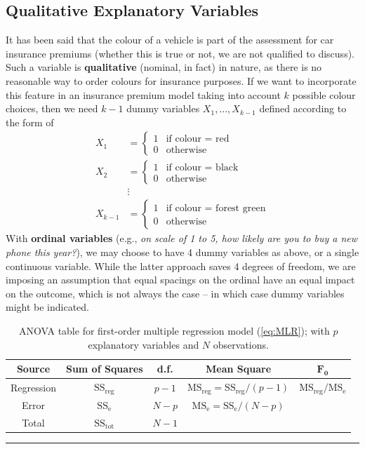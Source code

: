 \subsection{Qualitative Explanatory Variables}
It has been said that the colour of a vehicle is part of the assessment for car insurance premiums (whether this is true or not, we are not qualified to discuss). Such a variable is \textbf{qualitative} (nominal, in fact) in nature, as there is no reasonable way to order colours for insurance purposes. If we want to incorporate this feature in an insurance premium model taking into account $k$ possible colour choices, then we need $k-1$ dummy variables $X_1,\ldots,X_{k-1}$ defined according to  the form of
\begin{align*}
    X_{1} &= 
    \begin{cases}
    1 & \text{if colour $=$ red}\\
    0 & \text{otherwise}
    \end{cases}\\
    X_{2} &= 
    \begin{cases}
    1 & \text{if colour $=$ black}\\
    0 & \text{otherwise}
    \end{cases}\\
    & \vdots\\
    X_{k-1} &= 
    \begin{cases}
    1 & \text{if colour $=$ forest green}\\
    0 & \text{otherwise}
    \end{cases}
\end{align*}
With \textbf{ordinal variables} (e.g., \textit{on scale of 1 to 5, how likely are you to buy a new phone this year?}), we may choose to have 4 dummy variables as above, or a single continuous variable. While the latter approach saves 4 degrees of freedom, we are imposing an assumption that equal spacings on the ordinal have an equal impact on the outcome, which is not always the case -- in which case dummy variables might be indicated.

     \begin{table}[!t]
         \centering
         \begin{tabular}{c c c c c}
         \hline
        \textbf{Source} & \textbf{Sum of Squares} & \textbf{d.f.} & \textbf{Mean Square} & $\mathbf{F_{0}}$ \\
         \hline
         Regression & $\text{SS}_{\textrm{reg}}$ & $p-1$ & $\text{MS}_{\textrm{reg}}=\text{SS}_{\textrm{reg}}/(p-1)$ & $\text{MS}_{\textrm{reg}}/\text{MS}_{\textrm{e}}$\\
         Error & $\text{SS}_{\textrm{e}}$ & $N-p$ & $\text{MS}_{\textrm{e}}=\text{SS}_{\textrm{e}}/(N-p)$ \\
         Total & $\text{SS}_{\textrm{tot}}$ & $N-1$\\
        \hline
         \end{tabular}
         \caption[\small ANOVA table for first-order multiple regression]{\small ANOVA table for first-order multiple regression model (\ref{eq:MLR}); with $p$ explanatory variables and $N$ observations. }
         \label{tab:SA4}\hrule
     \end{table}
